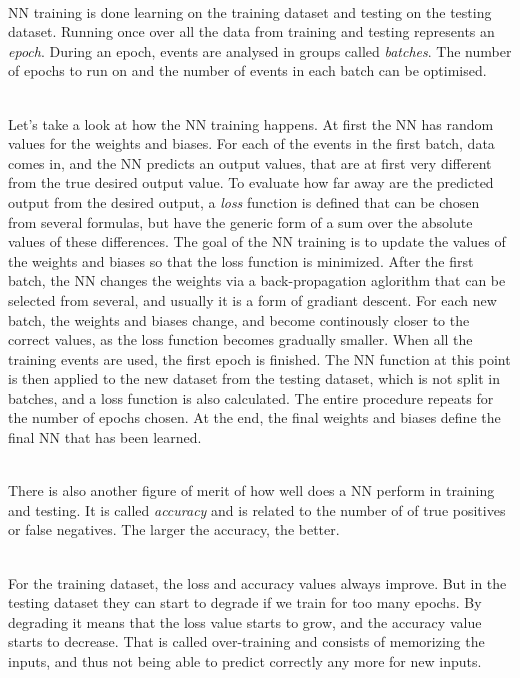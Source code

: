 \ \\NN training is done learning on the training dataset and testing on the testing dataset. Running once over all the data from training and testing represents an \emph{epoch}. During an epoch, events are analysed in groups called \emph{batches}. The number of epochs to run on and the number of events in each batch can be optimised.

\ \\ Let's take a look at how the NN training happens. At first the NN has random values for the weights and biases. For each of the events in the first batch, data comes in, and the NN predicts an output values, that are at first very different from the true desired output value. To evaluate how far away are the predicted output from the desired output, a \emph{loss} function is defined that can be chosen from several formulas, but have the generic form of a sum over the absolute values of these differences. The goal of the NN training is to update the values of the weights and biases so that the loss function is minimized. After the first batch, the NN changes the weights via a back-propagation aglorithm that can be selected from several, and usually it is a form of gradiant descent. For each new batch, the weights and biases change, and become continously closer to the correct values, as the loss function becomes gradually smaller. When all the training events are used, the first epoch is finished. The NN function at this point is then applied to the new dataset from the testing dataset, which is not split in batches, and a loss function is also calculated. The entire procedure repeats for the number of epochs chosen. At the end, the final weights and biases define the final NN that has been learned.

\ \\There is also another figure of merit of how well does a NN perform in training and testing. It is called \emph{accuracy} and is related to the number of of true positives or false negatives. The larger the accuracy, the better.

\ \\For the training dataset, the loss and accuracy values always improve. But in the testing dataset they can start to degrade if we train for too many epochs. By degrading it means that the loss value starts to grow, and the accuracy value starts to decrease. That is called over-training and consists of memorizing the inputs, and thus not being able to predict correctly any more for new inputs. 

